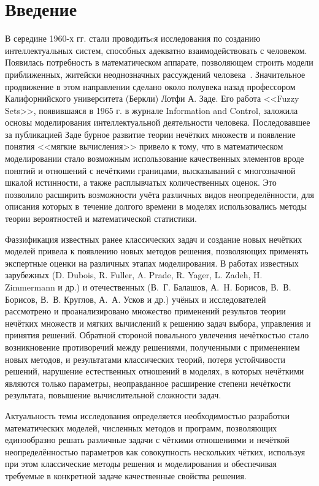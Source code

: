 \chapter*{Введение}

В середине 1960-х гг. стали проводитьcя исследования по созданию интеллектуальных систем, способных адекватно взаимодействовать с человеком. Появилась потребность в математическом аппарате, позволяющем строить модели приближенных, житейски неоднозначных рассуждений человека~\cite{Ukhobotov_Chosen}. Значительное продвижение в этом направлении сделано около полувека назад профессором Калифорнийского университета (Беркли) Лотфи А. Заде. Его работа <<Fuzzy Sets>>, появившаяся в 1965 г. в журнале Information and Control, заложила основы моделирования интеллектуальной деятельности человека. Последовавшее за публикацией Заде бурное развитие теории нечётких множеств и появление понятия <<мягкие вычисления>> привело к тому, что в математическом моделировании стало возможным использование качественных элементов вроде понятий и отношений с нечёткими границами, высказываний с многозначной шкалой истинности, а также расплывчатых количественных оценок. Это позволило расширить возможности учёта различных видов неопределённости, для описания которых в~течение долгого времени в моделях использовались методы теории вероятностей и математической статистики.

Фаззификация известных ранее классических задач и создание новых нечётких моделей привела к появлению новых методов решения, позволяющих применять экспертные оценки на различных этапах моделирования. В работах известных зарубежных (D. Dubois, R. Fuller, A. Prade, R. Yager, L. Zadeh, H. Zimmermann и др.) и отечественных (В.~Г. Балашов, А.~H. Борисов, В.~В. Борисов, В.~В. Круглов, А.~А. Усков и др.) учёных и исследователей рассмотрено и проанализировано множество применений результов теории нечётких множеств и мягких вычислений к решению задач выбора, управления и принятия решений. Обратной стороной повального увлечения нечёткостью стало возникновение противоречий между решениями, полученными с применением новых методов, и результатами классических теорий, потеря устойчивости решений, нарушение естественных отношений в моделях, в которых нечёткими являются только параметры, неоправданное расширение степени нечёткости результата, повышение вычислительной сложности задач.

Актуальность темы исследования определяется необходимостью разработки математических моделей, численных методов и программ, позволяющих единообразно решать различные задачи с чёткими отношениями и нечёткой неопределённостью параметров как совокупность нескольких чётких, используя при этом классические методы решения и моделирования и обеспечивая требуемые в конкретной задаче качественные свойства решения.

